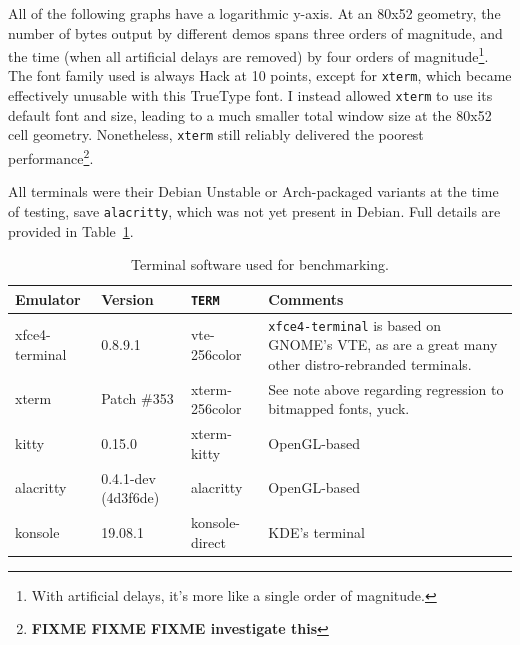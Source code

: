 All of the following graphs have a logarithmic y-axis. At an 80x52 geometry,
the number of bytes output by different demos spans three orders of magnitude,
and the time (when all artificial delays are removed) by four orders of
magnitude\footnote{With artificial delays, it's more like a single order of
magnitude.}. The font family used is always Hack\cite{hacktypeface} at 10 points,
except for \texttt{xterm}, which became effectively unusable with this TrueType
font. I instead allowed \texttt{xterm} to use its default font and size, leading
to a much smaller total window size at the 80x52 cell geometry. Nonetheless,
\texttt{xterm} still reliably delivered the poorest performance\footnote{\textbf{FIXME FIXME FIXME investigate this}}.

All terminals were their Debian Unstable or Arch-packaged variants at the time
of testing, save \texttt{alacritty}, which was not yet present in Debian. Full
details are provided in Table~\ref{table:benchterms}.

\begin{table}
  \centering
  \begin{tabular}{|l|l|l|p{}|}
    \hline
    Emulator & Version & \texttt{TERM} & Comments \\
    \hline
    \hline
    xfce4-terminal & 0.8.9.1 & vte-256color & \texttt{xfce4-terminal} is based on GNOME's VTE\cite{gnomevte}, as are a great many other distro-rebranded terminals. \\
    \hline
    xterm & Patch \#353 & xterm-256color & See note above regarding regression to bitmapped fonts, yuck. \\
    \hline
    kitty & 0.15.0 & xterm-kitty & OpenGL-based \\
    \hline
    alacritty & 0.4.1-dev (4d3f6de) & alacritty & OpenGL-based \\
    \hline
    konsole & 19.08.1 & konsole-direct & KDE's terminal \\
    \hline
  \end{tabular}
\caption{Terminal software used for benchmarking.}
\label{table:benchterms}
\end{table}

